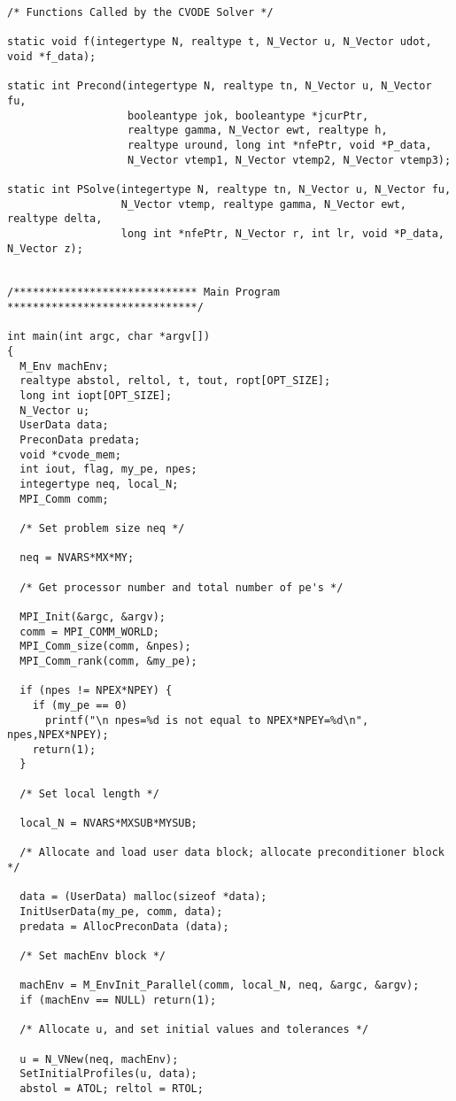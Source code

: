 \begin{verbatim}
/* Functions Called by the CVODE Solver */

static void f(integertype N, realtype t, N_Vector u, N_Vector udot, void *f_data);

static int Precond(integertype N, realtype tn, N_Vector u, N_Vector fu, 
                   booleantype jok, booleantype *jcurPtr, 
                   realtype gamma, N_Vector ewt, realtype h,
                   realtype uround, long int *nfePtr, void *P_data,
                   N_Vector vtemp1, N_Vector vtemp2, N_Vector vtemp3);

static int PSolve(integertype N, realtype tn, N_Vector u, N_Vector fu, 
                  N_Vector vtemp, realtype gamma, N_Vector ewt, realtype delta, 
                  long int *nfePtr, N_Vector r, int lr, void *P_data, N_Vector z);


/***************************** Main Program ******************************/

int main(int argc, char *argv[])
{
  M_Env machEnv;
  realtype abstol, reltol, t, tout, ropt[OPT_SIZE];
  long int iopt[OPT_SIZE];
  N_Vector u;
  UserData data;
  PreconData predata;
  void *cvode_mem;
  int iout, flag, my_pe, npes;
  integertype neq, local_N;
  MPI_Comm comm;

  /* Set problem size neq */

  neq = NVARS*MX*MY;

  /* Get processor number and total number of pe's */

  MPI_Init(&argc, &argv);
  comm = MPI_COMM_WORLD;
  MPI_Comm_size(comm, &npes);
  MPI_Comm_rank(comm, &my_pe);

  if (npes != NPEX*NPEY) {
    if (my_pe == 0)
      printf("\n npes=%d is not equal to NPEX*NPEY=%d\n", npes,NPEX*NPEY);
    return(1);
  }

  /* Set local length */

  local_N = NVARS*MXSUB*MYSUB;

  /* Allocate and load user data block; allocate preconditioner block */

  data = (UserData) malloc(sizeof *data);
  InitUserData(my_pe, comm, data);
  predata = AllocPreconData (data);

  /* Set machEnv block */

  machEnv = M_EnvInit_Parallel(comm, local_N, neq, &argc, &argv);
  if (machEnv == NULL) return(1);

  /* Allocate u, and set initial values and tolerances */ 

  u = N_VNew(neq, machEnv);
  SetInitialProfiles(u, data);
  abstol = ATOL; reltol = RTOL;


\end{verbatim}
